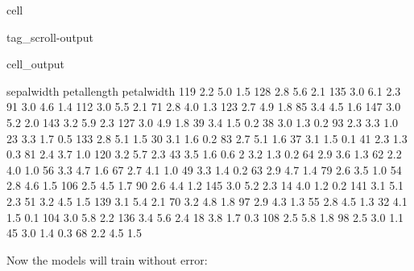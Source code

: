 \documentclass[letterpaper,10pt,english]{jupyterBook}
\begin{document}
\begin{sphinxuseclass}{cell}
\begin{sphinxuseclass}{tag_scroll-output}
\begin{sphinxVerbatimOutput}
\begin{sphinxuseclass}{cell_output}
\begin{sphinxVerbatim}[commandchars=\\\{\}]
     sepal\PYGZhy{}width  petal\PYGZhy{}length  petal\PYGZhy{}width
119          2.2           5.0          1.5
128          2.8           5.6          2.1
135          3.0           6.1          2.3
91           3.0           4.6          1.4
112          3.0           5.5          2.1
71           2.8           4.0          1.3
123          2.7           4.9          1.8
85           3.4           4.5          1.6
147          3.0           5.2          2.0
143          3.2           5.9          2.3
127          3.0           4.9          1.8
39           3.4           1.5          0.2
38           3.0           1.3          0.2
93           2.3           3.3          1.0
23           3.3           1.7          0.5
133          2.8           5.1          1.5
30           3.1           1.6          0.2
83           2.7           5.1          1.6
37           3.1           1.5          0.1
41           2.3           1.3          0.3
81           2.4           3.7          1.0
120          3.2           5.7          2.3
43           3.5           1.6          0.6
2            3.2           1.3          0.2
64           2.9           3.6          1.3
62           2.2           4.0          1.0
56           3.3           4.7          1.6
67           2.7           4.1          1.0
49           3.3           1.4          0.2
63           2.9           4.7          1.4
79           2.6           3.5          1.0
54           2.8           4.6          1.5
106          2.5           4.5          1.7
90           2.6           4.4          1.2
145          3.0           5.2          2.3
14           4.0           1.2          0.2
141          3.1           5.1          2.3
51           3.2           4.5          1.5
139          3.1           5.4          2.1
70           3.2           4.8          1.8
97           2.9           4.3          1.3
55           2.8           4.5          1.3
32           4.1           1.5          0.1
104          3.0           5.8          2.2
136          3.4           5.6          2.4
18           3.8           1.7          0.3
108          2.5           5.8          1.8
98           2.5           3.0          1.1
45           3.0           1.4          0.3
68           2.2           4.5          1.5
\end{sphinxVerbatim}

\end{sphinxuseclass}\end{sphinxVerbatimOutput}

\end{sphinxuseclass}
\end{sphinxuseclass}
\sphinxAtStartPar
Now the models will train without error:
\end{document}
